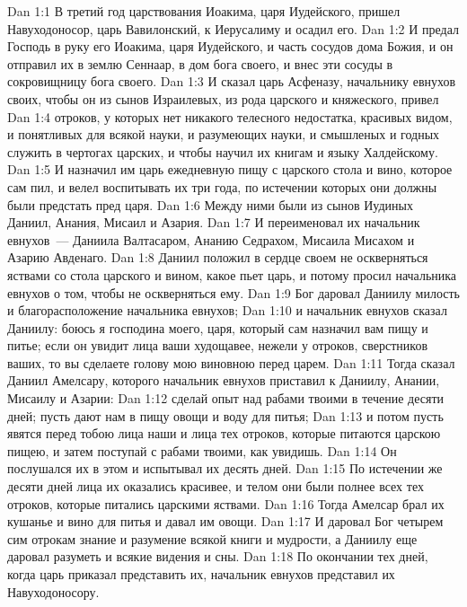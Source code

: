 \vs Dan 1:1 В третий год царствования Иоакима, царя Иудейского, пришел Навуходоносор, царь Вавилонский, к Иерусалиму и осадил его.
\vs Dan 1:2 И предал Господь в руку его Иоакима, царя Иудейского, и часть сосудов дома Божия, и он отправил их в землю Сеннаар, в дом бога своего, и внес эти сосуды в сокровищницу бога своего.
\vs Dan 1:3 И сказал царь Асфеназу, начальнику евнухов своих, чтобы он из сынов Израилевых, из рода царского и княжеского, привел
\vs Dan 1:4 отроков, у которых нет никакого телесного недостатка, красивых видом, и понятливых для всякой науки, и разумеющих науки, и смышленых и годных служить в чертогах царских, и чтобы научил их книгам и языку Халдейскому.
\vs Dan 1:5 И назначил им царь ежедневную пищу с царского стола и вино, которое сам пил, и велел воспитывать их три года, по истечении которых они должны были предстать пред царя.
\vs Dan 1:6 Между ними были из сынов Иудиных Даниил, Анания, Мисаил и Азария.
\vs Dan 1:7 И переименовал их начальник евнухов~--- Даниила Валтасаром, Ананию Седрахом, Мисаила Мисахом и Азарию Авденаго.
\vs Dan 1:8 Даниил положил в сердце своем не оскверняться яствами со стола царского и вином, какое пьет царь, и потому просил начальника евнухов о том, чтобы не оскверняться ему.
\vs Dan 1:9 Бог даровал Даниилу милость и благорасположение начальника евнухов;
\vs Dan 1:10 и начальник евнухов сказал Даниилу: боюсь я господина моего, царя, который сам назначил вам пищу и питье; если он увидит лица ваши худощавее, нежели у отроков, сверстников ваших, то вы сделаете голову мою виновною перед царем.
\vs Dan 1:11 Тогда сказал Даниил Амелсару, которого начальник евнухов приставил к Даниилу, Анании, Мисаилу и Азарии:
\vs Dan 1:12 сделай опыт над рабами твоими в течение десяти дней; пусть дают нам в пищу овощи и воду для питья;
\vs Dan 1:13 и потом пусть явятся перед тобою лица наши и лица тех отроков, которые питаются царскою пищею, и затем поступай с рабами твоими, как увидишь.
\vs Dan 1:14 Он послушался их в этом и испытывал их десять дней.
\vs Dan 1:15 По истечении же десяти дней лица их оказались красивее, и телом они были полнее всех тех отроков, которые питались царскими яствами.
\vs Dan 1:16 Тогда Амелсар брал их кушанье и вино для питья и давал им овощи.
\vs Dan 1:17 И даровал Бог четырем сим отрокам знание и разумение всякой книги и мудрости, а Даниилу еще даровал разуметь и всякие видения и сны.
\vs Dan 1:18 По окончании тех дней, когда царь приказал представить их, начальник евнухов представил их Навуходоносору.
